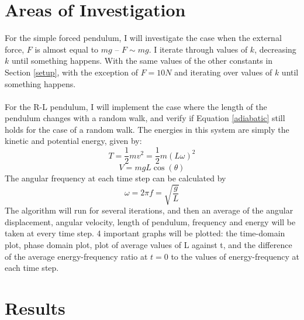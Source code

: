 \documentclass[10pt, twocolumn]{article}
\begin{document}
\section{Areas of Investigation}
For the simple forced pendulum, I will investigate the case when the external force, $F$ is almost equal to $mg$ -- $F \sim{mg}$. I iterate through values of $k$, decreasing $k$ until something happens. With the same values of the other constants in Section \ref{setup}, with the exception of $F = 10N$ and iterating over values of $k$ until something happens.\\
\\
For the R-L pendulum, I will implement the case where the length of the pendulum changes with a random walk, and verify if Equation \eqref{adiabatic} still holds for the case of a random walk. The energies in this system are simply the kinetic and potential energy, given by:
\begin{equation}
    T = \frac{1}{2}mv^2 = \frac{1}{2}m(L\omega)^2
\end{equation}
\begin{equation}
    V = mgL\cos(\theta) 
\end{equation}
The angular frequency at each time step can be calculated by
\begin{equation}
    \omega = 2\pi{f} = \sqrt{\frac{g}{L}}
\end{equation}
The algorithm will run for several iterations, and then an average of the angular displacement, angular velocity, length of pendulum, frequency and energy will be taken at every time step. 4 important graphs will be plotted: the time-domain plot, phase domain plot, plot of average values of L against t, and the difference of the average energy-frequency ratio at $t = 0$ to the values of energy-frequency at each time step.
\section{Results}
\end{document}

